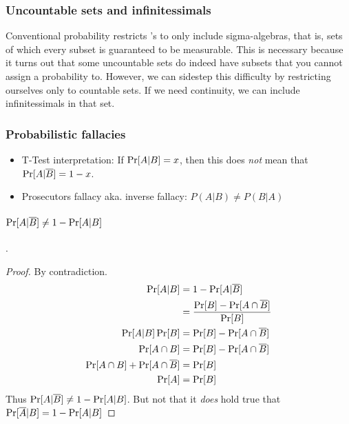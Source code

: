 \subsubsection{Uncountable sets and infinitessimals}

Conventional probability restricts \samplespace 's to only include sigma-algebras, that is, sets of which every subset is guaranteed to be measurable. This is necessary because it turns out that some uncountable sets do indeed have subsets that you cannot assign a probability to. However, we can sidestep this difficulty by restricting ourselves only to countable sets. If we need continuity, we can include infinitessimals in that set.

 
 
 
 
 \subsubsection{Probabilistic fallacies}
 \begin{itemize}
     \item T-Test interpretation: If $\operatorname{Pr}[A|B] = x$, then this does \emph{not} mean that $\operatorname{Pr}[A|\overline{B}] = 1 - x$.
     \item Prosecutors fallacy aka. inverse fallacy: $P(A|B) \neq P(B|A)$
 \end{itemize}

 \paragraph{$\operatorname{Pr}[A|\overline{B}] \neq 1 - \operatorname{Pr}[A | B]$}. 
 \begin{proof}
     By contradiction. 
     \begin{equation}
         \begin{aligned}
            \operatorname{Pr}[A|B]                 &= 1 - \operatorname{Pr}[A | \overline{B}] \\
                                            &= \frac{  \operatorname{Pr}[B] - \operatorname{Pr}[A \cap \overline{B}]  }{  \operatorname{Pr}[B]  }  \\
            \operatorname{Pr}[A|B] \operatorname{Pr}[B]   &=         \operatorname{Pr}[B] - \operatorname{Pr}[A \cap \overline{B}] \\
            \operatorname{Pr}[A \cap B]   &= \operatorname{Pr}[B] - \operatorname{Pr}[A \cap \overline{B}] \\
            \operatorname{Pr}[A \cap B] + \operatorname{Pr}[A \cap \overline{B}]  &= \operatorname{Pr}[B] \\
            \operatorname{Pr}[A] &= \operatorname{Pr}[B]
         \end{aligned}
     \end{equation}
     Thus $\operatorname{Pr}[A|\overline{B}] \neq 1 - \operatorname{Pr}[A | B]$. But not that it \emph{does} hold true that $\operatorname{Pr}[\overline{A}|B] = 1 - \operatorname{Pr}[A | B]$
 \end{proof}
 



